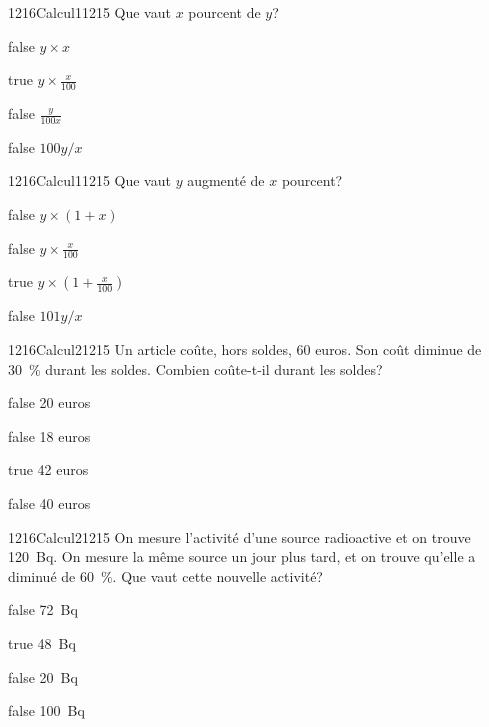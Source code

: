         	\begin{question}{1216}{Calcul}{1}{1215}
				Que vaut $x$ pourcent de $y$?
            \end{question}
            \begin{reponses}
            	\item[false] $y\times x$
            	\item[true] $y\times \frac{x}{100}$
                \item[false] $\frac{y}{100x}$
                \item[false] $100y/x$
            \end{reponses}
        	\begin{question}{1216}{Calcul}{1}{1215}
				Que vaut $y$ augmenté de $x$ pourcent?
            \end{question}
            \begin{reponses}
            	\item[false] $y\times (1+x)$
            	\item[false] $y\times \frac{x}{100}$
                \item[true] $y\times (1+\frac{x}{100})$
                \item[false] $101y/x$
            \end{reponses}
            \begin{question}{1216}{Calcul}{2}{1215}
                Un article coûte, hors soldes, 60 euros. Son coût diminue de \SI{30}{\percent} durant les soldes. Combien coûte-t-il durant les soldes?
            \end{question}
            \begin{reponses}
                \item[false] 20 euros
                \item[false] 18 euros
                \item[true] 42 euros
                \item[false] 40 euros
            \end{reponses}
            \begin{question}{1216}{Calcul}{2}{1215}
                On mesure l'activité d'une source radioactive et on trouve \SI{120}{\becquerel}. On mesure la même source un jour plus tard, et on trouve qu'elle a diminué de \SI{60}{\percent}. Que vaut cette nouvelle activité?
            \end{question}
            \begin{reponses}
                \item[false] \SI{72}{\becquerel}
                \item[true] \SI{48}{\becquerel}
                \item[false] \SI{20}{\becquerel}
                \item[false] \SI{100}{\becquerel}
            \end{reponses}
